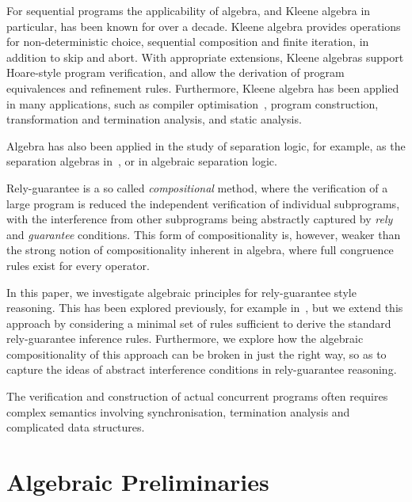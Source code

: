 \documentclass{llncs}
\begin{document}
For sequential programs the applicability of algebra, and Kleene
algebra in particular, has been known for over a decade. Kleene
algebra provides operations for non-deterministic choice, sequential
composition and finite iteration, in addition to skip and abort. With
appropriate extensions, Kleene algebras support Hoare-style program
verification, and allow the derivation of program equivalences and
refinement rules. Furthermore, Kleene algebra has been applied in many
applications, such as compiler
optimisation~\cite{kozen_certification_2000}, program construction,
transformation and termination analysis, and static analysis.

Algebra has also been applied in the study of separation logic, for
example, as the separation algebras in~\cite{ohearn}, or in algebraic
separation logic.



Rely-guarantee is a so called \emph{compositional} method, where the
verification of a large program is reduced the independent
verification of individual subprograms, with the interference from
other subprograms being abstractly captured by \emph{rely} and
\emph{guarantee} conditions. This form of compositionality is,
however, weaker than the strong notion of compositionality inherent in
algebra, where full congruence rules exist for every operator.

In this paper, we investigate algebraic principles for rely-guarantee
style reasoning. This has been explored previously, for example
in~\cite{cka}, but we extend this approach by considering a minimal
set of rules sufficient to derive the standard rely-guarantee
inference rules. Furthermore, we explore how the algebraic
compositionality of this approach can be broken in just the right way,
so as to capture the ideas of abstract interference conditions in
rely-guarantee reasoning.

The verification and construction of actual concurrent programs often
requires complex semantics involving synchronisation, termination
analysis and complicated data structures.



\section{Algebraic Preliminaries}
\label{sec:KA}
\end{document}
